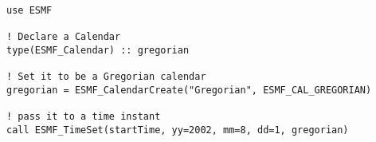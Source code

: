 
\begin{verbatim}
use ESMF

! Declare a Calendar
type(ESMF_Calendar) :: gregorian

! Set it to be a Gregorian calendar
gregorian = ESMF_CalendarCreate("Gregorian", ESMF_CAL_GREGORIAN)

! pass it to a time instant
call ESMF_TimeSet(startTime, yy=2002, mm=8, dd=1, gregorian)
\end{verbatim}
